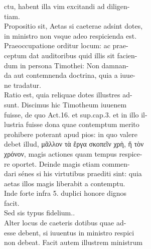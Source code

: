 \documentclass{article}
\begin{document}
\begin{pages}
                ctu, habent illa vim excitandi ad diligen- \\
                tiam. \\
                Propositio sit, Aetas si caeterae adsint dotes, \\
                in ministro non vsque adeo respicienda est. \\
                Praeoccupatione orditur locum: ac prae- \\
                ceptum dat auditoribus quid illis sit facien- \\
                dum in persona Timothei: Non damnan- \\
                da aut contemnenda doctrina, quia a iuue- \\
                ne tradatur. \\
                Ratio est, quia reliquae dotes illustres ad- \\
                sunt. Discimus hic Timotheum iuuenem \\
                fuisse, de quo Act.16. et sup.cap.3. et in illo il- \\
                lustria fuisse dona quae contemptum merito \\
                prohibere poterant apud pios: in quo valere \\
                debet illud, μᾶλλον τὰ ἔργα σκοπεῖν χρὴ, ἤ τὸν \\
                χρόνον, magis actiones quam tempus respice- \\
                re oportet. Deinde magis etiam commen- \\
                dari sénes si his virtutibus praediti sint: quia \\
                aetas illos magis liberabit a contemptu. \\
                Inde forte infra 5. duplici honore dignos \\
                facit. \\
                Sed sis typus fidelium.. \\
                Alter locus de caeteris dotibus quae ad- \\
                esse debent, si iuuentus in ministro respici \\
                non debeat. Facit autem illustrem ministrum \\

\end{pages}
\end{document}
